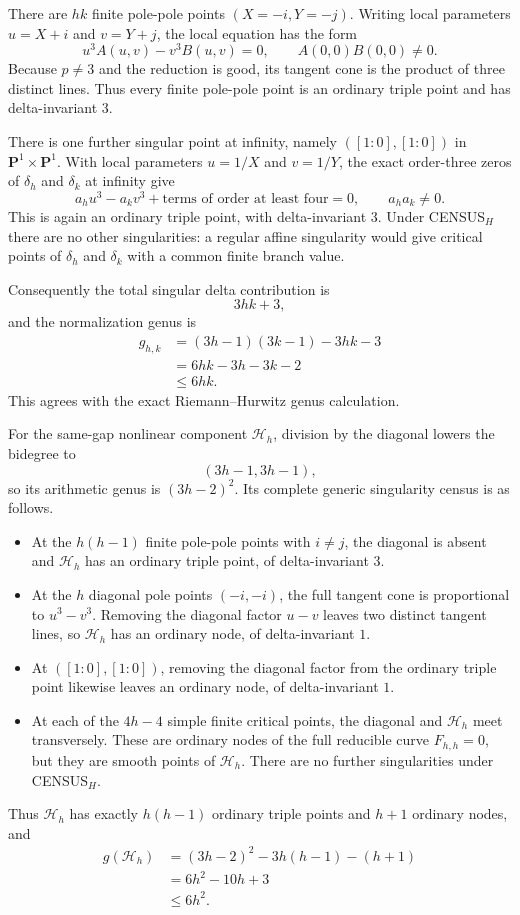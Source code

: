 \documentclass[11pt]{article}
\theoremstyle{remark}
\begin{document}
There are $hk$ finite pole-pole points $(X=-i,Y=-j)$.
Writing local parameters $u=X+i$ and $v=Y+j$, the local equation has the form
\[
u^3 A(u,v)-v^3 B(u,v)=0,
\qquad A(0,0)B(0,0)\ne0.
\]
Because $p\ne3$ and the reduction is good, its tangent cone is the product
of three distinct lines.  Thus every finite pole-pole point is an ordinary
triple point and has delta-invariant $3$.

There is one further singular point at infinity, namely
$([1:0],[1:0])$ in $\mathbf P^1\times\mathbf P^1$.  With local parameters
$u=1/X$ and $v=1/Y$, the exact order-three zeros of $\delta_h$ and
$\delta_k$ at infinity give
\[
a_h u^3-a_k v^3+\text{terms of order at least four}=0,
\qquad a_h a_k\ne0.
\]
This is again an ordinary triple point, with delta-invariant $3$.
Under CENSUS$_H$ there are no other singularities: a regular affine
singularity would give critical points of $\delta_h$ and $\delta_k$ with a
common finite branch value.

Consequently the total singular delta contribution is
\[
3hk+3,
\]
and the normalization genus is
\[
\begin{aligned}
g_{h,k}
&=(3h-1)(3k-1)-3hk-3\\
&=6hk-3h-3k-2\\
&\le 6hk.
\end{aligned}
\]
This agrees with the exact Riemann--Hurwitz genus calculation.

For the same-gap nonlinear component $\mathcal H_h$, division by the
diagonal lowers the bidegree to
\[
(3h-1,3h-1),
\]
so its arithmetic genus is $(3h-2)^2$.  Its complete generic singularity
census is as follows.
\begin{itemize}
\item At the $h(h-1)$ finite pole-pole points with $i\ne j$, the diagonal
is absent and $\mathcal H_h$ has an ordinary triple point, of delta-invariant
$3$.
\item At the $h$ diagonal pole points $(-i,-i)$, the full tangent cone is
proportional to $u^3-v^3$.  Removing the diagonal factor $u-v$ leaves two
distinct tangent lines, so $\mathcal H_h$ has an ordinary node, of
delta-invariant $1$.
\item At $([1:0],[1:0])$, removing the diagonal factor from the ordinary
triple point likewise leaves an ordinary node, of delta-invariant $1$.
\item At each of the $4h-4$ simple finite critical points, the diagonal and
$\mathcal H_h$ meet transversely.  These are ordinary nodes of the full
reducible curve $F_{h,h}=0$, but they are smooth points of $\mathcal H_h$.
There are no further singularities under CENSUS$_H$.
\end{itemize}
Thus $\mathcal H_h$ has exactly $h(h-1)$ ordinary triple points and $h+1$
ordinary nodes, and
\[
\begin{aligned}
g(\mathcal H_h)
&=(3h-2)^2-3h(h-1)-(h+1)\\
&=6h^2-10h+3\\
&\le 6h^2.
\end{aligned}
\]
\end{document}

